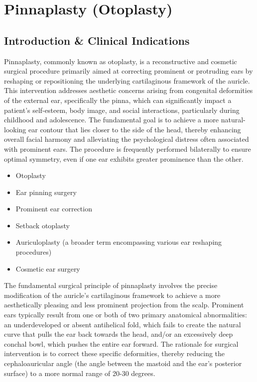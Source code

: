 \chapter{Pinnaplasty (Otoplasty)}

\section*{Introduction \& Clinical Indications}
Pinnaplasty, commonly known as otoplasty, is a reconstructive and cosmetic surgical procedure primarily aimed at correcting prominent or protruding ears by reshaping or repositioning the underlying cartilaginous framework of the auricle. This intervention addresses aesthetic concerns arising from congenital deformities of the external ear, specifically the pinna, which can significantly impact a patient's self-esteem, body image, and social interactions, particularly during childhood and adolescence. The fundamental goal is to achieve a more natural-looking ear contour that lies closer to the side of the head, thereby enhancing overall facial harmony and alleviating the psychological distress often associated with prominent ears. The procedure is frequently performed bilaterally to ensure optimal symmetry, even if one ear exhibits greater prominence than the other.

\begin{itemize}
  \item Otoplasty
  \item Ear pinning surgery
  \item Prominent ear correction
  \item Setback otoplasty
  \item Auriculoplasty (a broader term encompassing various ear reshaping procedures)
  \item Cosmetic ear surgery
\end{itemize}

The fundamental surgical principle of pinnaplasty involves the precise modification of the auricle's cartilaginous framework to achieve a more aesthetically pleasing and less prominent projection from the scalp. Prominent ears typically result from one or both of two primary anatomical abnormalities: an underdeveloped or absent antihelical fold, which fails to create the natural curve that pulls the ear back towards the head, and/or an excessively deep conchal bowl, which pushes the entire ear forward. The rationale for surgical intervention is to correct these specific deformities, thereby reducing the cephaloauricular angle (the angle between the mastoid and the ear's posterior surface) to a more normal range of 20-30 degrees.

